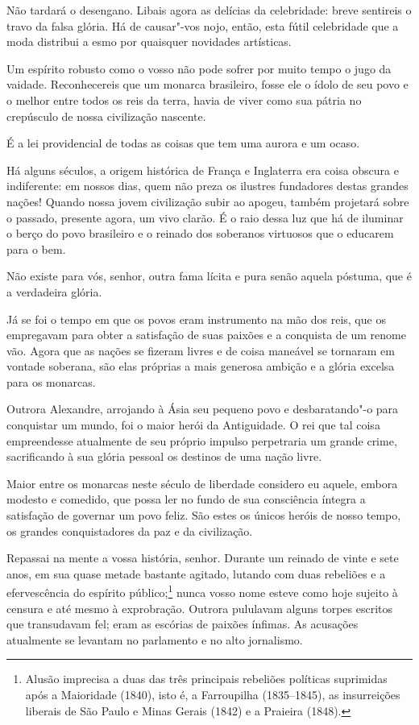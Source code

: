 Não tardará o desengano. Libais agora as delícias da celebridade: breve
sentireis o travo da falsa glória. Há de causar"-vos nojo, então, esta
fútil celebridade que a moda distribui a esmo por quaisquer novidades artísticas. 

Um espírito robusto como o vosso não pode sofrer por muito tempo o jugo
da vaidade. Reconhecereis que um monarca brasileiro, fosse ele o ídolo
de seu povo e o melhor entre todos os reis da terra, havia de viver
como sua pátria no crepúsculo de nossa civilização nascente. 

É a lei providencial de todas as coisas que tem uma aurora e um ocaso.

Há alguns séculos, a origem histórica de França e Inglaterra era coisa
obscura e indiferente: em nossos dias, quem não preza os ilustres
fundadores destas grandes nações! Quando nossa jovem civilização subir
ao apogeu, também projetará sobre o passado, presente agora, um vivo
clarão. É o raio dessa luz que há de iluminar o berço do povo
brasileiro e o reinado dos soberanos virtuosos que o educarem para o bem.

\setcounter{@sectionNumCenter}{1}

\sectionitem

Não existe para vós, senhor, outra fama lícita e pura senão aquela 
póstuma, que é a verdadeira glória.

Já se foi o tempo em que os povos eram instrumento na mão dos reis, que
os empregavam para obter a satisfação de suas paixões e a conquista de
um renome vão. Agora que as nações se fizeram livres e de coisa
maneável se tornaram em vontade soberana, são elas próprias a mais
generosa ambição e a glória excelsa para os monarcas.

Outrora Alexandre, arrojando à Ásia seu pequeno povo e desbaratando"-o
para conquistar um mundo, foi o maior herói da Antiguidade. O rei que
tal coisa empreendesse atualmente de seu próprio impulso perpetraria um
grande crime, sacrificando à sua glória pessoal os destinos de uma nação livre. 

Maior entre os monarcas neste século de liberdade considero eu aquele,
embora modesto e comedido, que possa ler no fundo de sua consciência
íntegra a satisfação de governar um povo feliz. São estes os únicos
heróis de nosso tempo, os grandes conquistadores da paz e da civilização.

Repassai na mente a vossa história, senhor. Durante um reinado de vinte e
sete anos, em sua quase metade bastante agitado, lutando com duas
rebeliões e a efervescência do espírito público;\footnote{ Alusão imprecisa a duas 
das três principais rebeliões políticas suprimidas após a Maioridade (1840), isto é, a 
Farroupilha (1835--1845), as insurreições liberais de São Paulo e Minas Gerais 
(1842) e a Praieira (1848).} 
nunca vosso nome esteve como hoje sujeito à censura e até mesmo à exprobração. Outrora
pululavam alguns torpes escritos que transudavam fel; eram as escórias
de paixões ínfimas. As acusações atualmente se levantam no parlamento e
no alto jornalismo.

